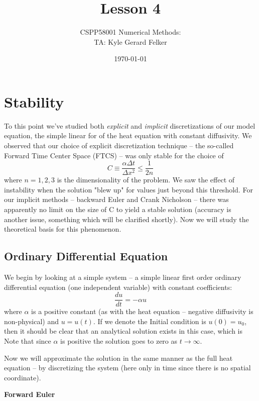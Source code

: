 \documentclass[11pt]{article}
\begin{document}
\title{Lesson 4} 
\author{CSPP58001 Numerical Methods: \\ TA: Kyle Gerard Felker}
\date{\today}
\maketitle


\section{Stability}
To this point we've studied both {\em explicit} and {\em implicit} discretizations of our model equation,  the simple linear for of the heat equation
with constant diffusivity. We observed that our choice of explicit discretization technique -- the so-called Forward Time Center Space (FTCS) -- was only stable for the choice of
$$C \equiv \frac{\alpha \Delta t}{\Delta x^2} \le \frac{1}{2n}$$ where $n=1,2,3$ is the dimensionality of the problem. We saw the effect of instability when the solution
"blew up" for values just beyond this threshold. For our implicit methods -- backward Euler and Crank Nicholson -- there was apparently no limit on the size of C to
yield a stable solution (accuracy is another issue, something which will be clarified shortly). Now we will study the theoretical basis for this phenomenon.

\subsection{Ordinary Differential Equation}

We begin by looking at  a simple system -- a simple linear first order ordinary differential equation (one independent variable) with constant coefficients:
\begin{equation}
\frac{du}{dt} = -\alpha u
\end{equation}
where $\alpha$ is a positive constant (as with the heat equation -- negative diffusivity is non-physical) and $u=u(t)$. If we denote the Initial condition is $u(0)=u_0$, then it
should be clear that an analytical solution exists in this case, which is  Note that since $\alpha$ is positive the solution goes to zero as $t \rightarrow \infty$.

Now we will approximate the solution in the same manner as the full heat equation -- by discretizing the system (here only in time since there is no spatial coordinate). 

{\bf Forward Euler}
\end{document}
